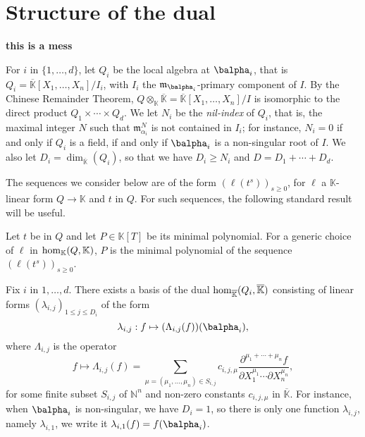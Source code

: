 \documentclass[12pt]{article}
\def\N {\ensuremath{\mathbb{N}}}
\def\K{\mathbb{K}}
\def\K {\ensuremath{\mathbb{K}}}
\def\Kbar {{\ensuremath{\overline{\mathbb{K}}}}}
\def\D {\ensuremath{D}}
\def\m {\ensuremath{\mathfrak{m}}}
\begin{document}

\section{Structure of the dual}

{\bf this is a mess}

For $i$ in $\{1,\dots,d\}$, let $Q_i$ be the local algebra at
$\balpha_i$, that is $Q_i=\Kbar[X_1,\dots,X_n]/I_i$, with $I_i$ the
$\m_{\balpha_i}$-primary component of $I$. By the Chinese Remainder
Theorem, $Q\otimes_\K \Kbar=\Kbar[X_1,\dots,X_n]/I$ is isomorphic to
the direct product $Q_1\times \cdots \times Q_d$.  We let $N_i$ be the
{\em nil-index} of $Q_i$, that is, the maximal integer $N$ such that
$\m_{\alpha_i}^N$ is not contained in $I_i$; for instance, $N_i=0$ if
and only if $Q_i$ is a field, if and only if $\balpha_i$ is a
non-singular root of $I$. We also let
$\D_i=\dim_\Kbar(Q_i)$, so that we have $D_i \ge N_i$ and $\D=\D_1 + \cdots + \D_d$.


The sequences we consider below are of the form $(\ell(t^s))_{s \ge
	0}$, for $\ell$ a $\K$-linear form $Q \to \K$ and $t$ in $Q$. For such
sequences, the following standard result will be useful.
\begin{lemma}\label{lemma:minpoly}
	Let $t$ be in $Q$ and let $P \in \K[T]$ be its minimal
	polynomial. For a generic choice of $\ell$ in ${\rm hom}_\K(Q,\K)$,
	$P$ is the minimal polynomial of the sequence $(\ell(t^s))_{s \ge
		0}$.
\end{lemma}


Fix $i$ in $1,\dots,d$.  There exists a basis of the dual ${\rm
	hom}_\Kbar(Q_i,\Kbar)$ consisting of linear forms
$(\lambda_{i,j})_{1\le j \le \D_i}$ of the form
$$\lambda_{i,j}: f \mapsto (\Lambda_{i,j}(f))(\balpha_i),$$
where $\Lambda_{i,j}$ is the operator
$$f \mapsto \Lambda_{i,j}(f) = \sum_{\mu=(\mu_1,\dots,\mu_n) \in
	S_{i,j}} c_{i,j,\mu} \frac{ \partial^{\mu_1 + \cdots + \mu_n} f}
{\partial X_1^{\mu_1} \cdots \partial X_n^{\mu_n}},$$ for some finite
subset $S_{i,j}$ of $\N^n$ and non-zero constants $c_{i,j,\mu}$ in
$\Kbar$. 
For instance, when $\balpha_i$ is non-singular, we have $D_i=1$, so
there is only one function $\lambda_{i,j}$, namely $\lambda_{i,1}$, we
write it $\lambda_{i,1}(f) = f(\balpha_i)$.
\end{document}

